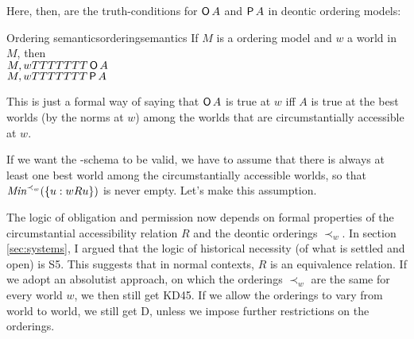 Here, then, are the truth-conditions for $\operatorname{\mathsf{O}} A$ and $\operatorname{\mathsf{P}} A$ in deontic ordering
models:


\begin{definition}{Ordering semantics}{orderingsemantics}
  If $M$ is a ordering model and $w$ a world in $M$, then\\[1mm]
  $M,w TTTTTTT \operatorname{\mathsf{O}} A$ \\
  $M,w TTTTTTT \operatorname{\mathsf{P}} A$ 
\end{definition}

This is just a formal way of saying that $\operatorname{\mathsf{O}} A$ is true at $w$ iff $A$ is true
at the best worlds (by the norms at $w$) among the worlds that are circumstantially accessible at $w$.

If we want the -schema to be valid, we have to assume that there is always
at least one best world among the circumstantially accessible worlds, so that
$\emph{Min}^{\prec_w}(\{ u: wRu\})$ is never empty. Let's make this assumption.

The logic of obligation and permission now depends on formal properties of the
circumstantial accessibility relation $R$ and the deontic orderings $\prec_w$.
In section \ref{sec:systems}, I argued that the logic of historical necessity
(of what is settled and open) is S5. This suggests that in normal contexts, $R$
is an equivalence relation. If we adopt an absolutist approach, on which the
orderings $\prec_{w}$ are the same for every world $w$, we then still get KD45.
If we allow the orderings to vary from world to world, we still get D, unless we
impose further restrictions on the orderings.


